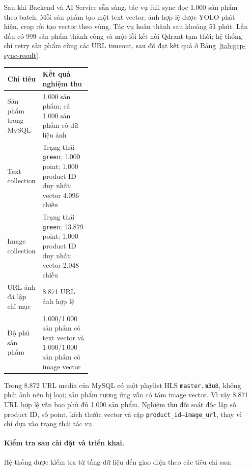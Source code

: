 Sau khi Backend và AI Service sẵn sàng, tác vụ full sync đọc 1.000 sản phẩm theo batch. Mỗi sản phẩm tạo một text vector; ảnh hợp lệ được YOLO phát hiện, crop rồi tạo vector theo vùng. Tác vụ hoàn thành sau khoảng 51 phút. Lần đầu có 999 sản phẩm thành công và một lỗi kết nối Qdrant tạm thời; hệ thống chỉ retry sản phẩm cùng các URL timeout, sau đó đạt kết quả ở Bảng~\ref{tab:gcp-sync-result}.

\begin{breakabletable}
\centering
\caption{Kết quả đồng bộ và đối soát dữ liệu trên GCP}
\label{tab:gcp-sync-result}
\begin{tabularx}{\linewidth}{|p{0.34\linewidth}|X|}
\hline
\textbf{Chỉ tiêu} & \textbf{Kết quả nghiệm thu} \\ \hline
Sản phẩm trong MySQL & 1.000 sản phẩm; cả 1.000 sản phẩm có dữ liệu ảnh \\ \hline
Text collection & Trạng thái \texttt{green}; 1.000 point; 1.000 product ID duy nhất; vector 4.096 chiều \\ \hline
Image collection & Trạng thái \texttt{green}; 13.879 point; 1.000 product ID duy nhất; vector 2.048 chiều \\ \hline
URL ảnh đã lập chỉ mục & 8.871 URL ảnh hợp lệ \\ \hline
Độ phủ sản phẩm & 1.000/1.000 sản phẩm có text vector và 1.000/1.000 sản phẩm có image vector \\ \hline
\end{tabularx}
\end{breakabletable}

Trong 8.872 URL media của MySQL có một playlist HLS \texttt{master.m3u8}, không phải ảnh nên bị loại; sản phẩm tương ứng vẫn có tám image vector. Vì vậy 8.871 URL hợp lệ vẫn bao phủ đủ 1.000 sản phẩm. Nghiệm thu đối soát độc lập số product ID, số point, kích thước vector và cặp \texttt{product\_id--image\_url}, thay vì chỉ dựa vào trạng thái tác vụ.

\paragraph{Kiểm tra sau cài đặt và triển khai.}

Hệ thống được kiểm tra từ tầng dữ liệu đến giao diện theo các tiêu chí sau:

